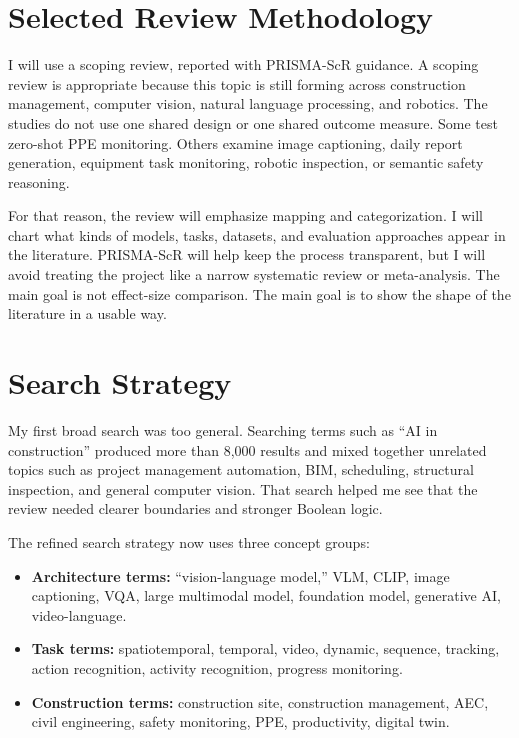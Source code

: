 \documentclass[10pt, letterpaper]{article}
\begin{document}
\section{Selected Review Methodology}

I will use a scoping review, reported with PRISMA-ScR guidance. A scoping review is appropriate because this topic is still forming across construction management, computer vision, natural language processing, and robotics. The studies do not use one shared design or one shared outcome measure. Some test zero-shot PPE monitoring. Others examine image captioning, daily report generation, equipment task monitoring, robotic inspection, or semantic safety reasoning.

For that reason, the review will emphasize mapping and categorization. I will chart what kinds of models, tasks, datasets, and evaluation approaches appear in the literature. PRISMA-ScR will help keep the process transparent, but I will avoid treating the project like a narrow systematic review or meta-analysis. The main goal is not effect-size comparison. The main goal is to show the shape of the literature in a usable way.

\section{Search Strategy}

My first broad search was too general. Searching terms such as ``AI in construction'' produced more than 8,000 results and mixed together unrelated topics such as project management automation, BIM, scheduling, structural inspection, and general computer vision. That search helped me see that the review needed clearer boundaries and stronger Boolean logic.

The refined search strategy now uses three concept groups:

\begin{itemize}
  \item \textbf{Architecture terms:} ``vision-language model,'' VLM, CLIP, image captioning, VQA, large multimodal model, foundation model, generative AI, video-language.
  \item \textbf{Task terms:} spatiotemporal, temporal, video, dynamic, sequence, tracking, action recognition, activity recognition, progress monitoring.
  \item \textbf{Construction terms:} construction site, construction management, AEC, civil engineering, safety monitoring, PPE, productivity, digital twin.
\end{itemize}
\end{document}

